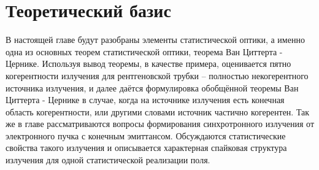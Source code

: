 \chapter{Теоретический базис} \label{chapt1}
В настоящей главе будут разобраны элементы статистической оптики, а именно одна из основных теорем статистической оптики, теорема Ван Циттерта - Цернике. Используя вывод теоремы, в качестве примера, оценивается пятно когерентности излучения для рентгеновской трубки -- полностью некогерентного источника излучения, и далее даётся формулировка обобщённой теоремы Ван Циттерта - Цернике в случае, когда на источнике излучения есть конечная область когерентности, или другими словами источник частично когерентен. Так же в главе рассматриваются вопросы формирования синхротронного излучения от электронного пучка с конечным эмиттансом. Обсуждаются статистические свойства такого излучения и описывается характерная спайковая структура излучения для одной статистической реализации поля.
